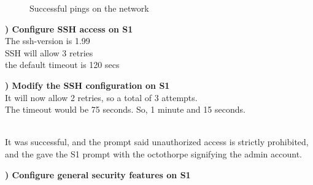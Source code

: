\documentclass{report}
\newcommand{\mysubsection}[2]{\textbf{\romannumeral #1) #2}}
\begin{document}
\begin{figure}[!hbt]\centering
{}\hfill
{}\par 
{}
\caption{Successful pings on the network}
\label{Ping10}
\end{figure}

\clearpage

\noindent\mysubsection{7}{Configure SSH access on S1}
\\The ssh-version is 1.99
\\SSH will allow 3 retries
\\the default timeout is 120 secs


\noindent\mysubsection{8}{Modify the SSH configuration on S1}
\\It will now allow 2 retries, so a total of 3 attempts.
\\The timeout would be 75 seconds. So, 1 minute and 15 seconds.


\\It was successful, and the prompt said unauthorized access is strictly
prohibited, and the gave the S1 prompt with the octothorpe signifying the admin
account.


\noindent\mysubsection{9}{Configure general security features on S1}


\end{document}
